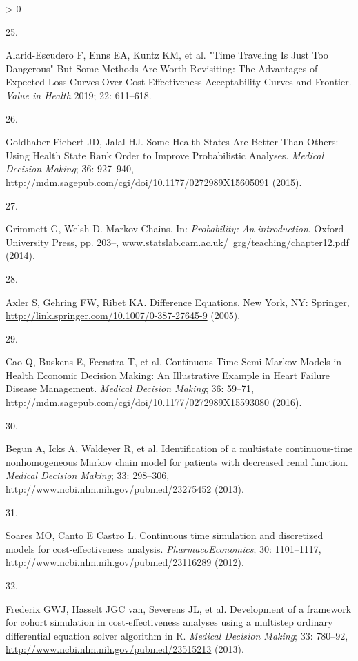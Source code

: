 \documentclass[
]{article}
\newlength{\cslhangindent}
\newlength{\csllabelwidth}
\newenvironment{CSLReferences}[2] %
 {%
  \setlength{\parindent}{0pt}
  \ifodd #1 \everypar{\setlength{\hangindent}{\cslhangindent}}\ignorespaces\fi
  \ifnum #2 > 0
  \setlength{\parskip}{#2\baselineskip}
  \fi
 }%
 {}
\newcommand{\CSLLeftMargin}[1]{\parbox[t]{\csllabelwidth}{#1}}
\newcommand{\CSLRightInline}[1]{\parbox[t]{\linewidth - \csllabelwidth}{#1}\break}
\begin{document}
\begin{CSLReferences}{0}{0}
\leavevmode\hypertarget{ref-Alarid-Escudero2019}{}%
\CSLLeftMargin{25. }
\CSLRightInline{Alarid-Escudero F, Enns EA, Kuntz KM, et al. {"Time Traveling Is Just Too Dangerous" But Some Methods Are Worth Revisiting: The Advantages of Expected Loss Curves Over Cost-Effectiveness Acceptability Curves and Frontier}. \emph{Value in Health} 2019; 22: 611--618.}

\leavevmode\hypertarget{ref-Goldhaber-Fiebert2015}{}%
\CSLLeftMargin{26. }
\CSLRightInline{Goldhaber-Fiebert JD, Jalal HJ. {Some Health States Are Better Than Others: Using Health State Rank Order to Improve Probabilistic Analyses}. \emph{Medical Decision Making}; 36: 927--940, \url{http://mdm.sagepub.com/cgi/doi/10.1177/0272989X15605091} (2015).}

\leavevmode\hypertarget{ref-Grimmett2014}{}%
\CSLLeftMargin{27. }
\CSLRightInline{Grimmett G, Welsh D. {Markov Chains}. In: \emph{Probability: An introduction}. Oxford University Press, pp. 203--, \href{https://www.statslab.cam.ac.uk/\%C2\%A0grg/teaching/chapter12.pdf}{www.statslab.cam.ac.uk/~grg/teaching/chapter12.pdf} (2014).}

\leavevmode\hypertarget{ref-Axler2005}{}%
\CSLLeftMargin{28. }
\CSLRightInline{Axler S, Gehring FW, Ribet KA. {Difference Equations}. New York, NY: Springer, \url{http://link.springer.com/10.1007/0-387-27645-9} (2005).}

\leavevmode\hypertarget{ref-Cao2016}{}%
\CSLLeftMargin{29. }
\CSLRightInline{Cao Q, Buskens E, Feenstra T, et al. {Continuous-Time Semi-Markov Models in Health Economic Decision Making: An Illustrative Example in Heart Failure Disease Management}. \emph{Medical Decision Making}; 36: 59--71, \url{http://mdm.sagepub.com/cgi/doi/10.1177/0272989X15593080} (2016).}

\leavevmode\hypertarget{ref-Begun2013}{}%
\CSLLeftMargin{30. }
\CSLRightInline{Begun A, Icks A, Waldeyer R, et al. {Identification of a multistate continuous-time nonhomogeneous Markov chain model for patients with decreased renal function.} \emph{Medical Decision Making}; 33: 298--306, \url{http://www.ncbi.nlm.nih.gov/pubmed/23275452} (2013).}

\leavevmode\hypertarget{ref-Soares2012}{}%
\CSLLeftMargin{31. }
\CSLRightInline{Soares MO, Canto E Castro L. {Continuous time simulation and discretized models for cost-effectiveness analysis}. \emph{PharmacoEconomics}; 30: 1101--1117, \url{http://www.ncbi.nlm.nih.gov/pubmed/23116289} (2012).}

\leavevmode\hypertarget{ref-Frederix2013a}{}%
\CSLLeftMargin{32. }
\CSLRightInline{Frederix GWJ, Hasselt JGC van, Severens JL, et al. {Development of a framework for cohort simulation in cost-effectiveness analyses using a multistep ordinary differential equation solver algorithm in R.} \emph{Medical Decision Making}; 33: 780--92, \url{http://www.ncbi.nlm.nih.gov/pubmed/23515213} (2013).}


\end{CSLReferences}
\end{document}
